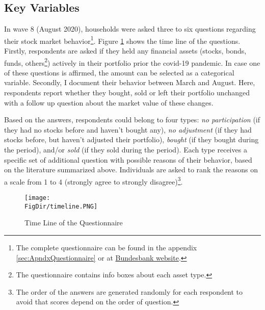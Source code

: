 \documentclass[ProjectABM]{subfiles}
\begin{document}
\subsection{Key Variables}
In wave 8 (August 2020), households were asked three to six questions regarding their stock market behavior\footnote{The complete questionnaire can be found in the appendix \ref{sec:ApndxQuestionnaire} or at \href{https://www.bundesbank.de/en/bundesbank/research/survey-on-consumer-expectations/questionnaires-850746}{Bundesbank website}.}. Figure \ref{fig:timeline} shows the time line of the questions. Firstly, respondents are asked if they held any financial assets (stocks, bonds, funds, others\footnote{The questionnaire contains info boxes about each asset type.}) actively in their portfolio prior the covid-19 pandemic. In case one of these questions is affirmed, the amount can be selected as a categorical variable. Secondly, I document their behavior between March and August. Here, respondents report whether they bought, sold or left their portfolio unchanged with a follow up question about the market value of these changes. %

Based on the answers, respondents could belong to four types: \textit{no participation} (if they had no stocks before and haven't bought any), \textit{no adjustment} (if they had stocks before, but haven't adjusted their portfolio), \textit{bought} (if they bought during the period), and/or \textit{sold} (if they sold during the period). Each type receives a specific set of additional question with possible reasons of their behavior, based on the literature summarized above. Individuals are asked to rank the reasons on a scale from 1 to 4 (strongly agree to strongly disagree)\footnote{ The order of the answers are generated randomly for each respondent to avoid that scores depend on the order of question.}.


\begin{figure}
	\centering
	\texttt{[image: \\FigDir/timeline.PNG]}
	\caption{Time Line of the Questionnaire}
	\label{fig:timeline}
\end{figure}
\end{document}
